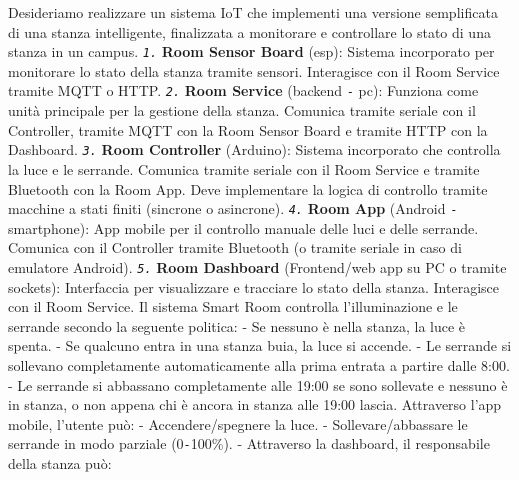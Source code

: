 \documentclass[12pt]{article}
\def\code#1{\texttt{#1}}
\begin{document}
Desideriamo realizzare un sistema IoT che implementi una versione semplificata di una stanza intelligente, finalizzata a monitorare e controllare lo stato di una stanza in un campus.\newline
\textit{\code{1.}} \textbf{Room Sensor Board} (esp): Sistema incorporato per monitorare lo stato della stanza tramite sensori. Interagisce con il Room Service tramite MQTT o HTTP.\newline
\textit{\code{2.}} \textbf{Room Service} (backend \code{-} pc): Funziona come unità principale per la gestione della stanza. Comunica tramite seriale con il Controller, tramite MQTT con la Room Sensor Board e tramite HTTP con la Dashboard.\newline
\textit{\code{3.}} \textbf{Room Controller} (Arduino): Sistema incorporato che controlla la luce e le serrande. Comunica tramite seriale con il Room Service e tramite Bluetooth con la Room App. Deve implementare la logica di controllo tramite macchine a stati finiti (sincrone o asincrone).\newline
\textit{\code{4.}} \textbf{Room App} (Android \code{-} smartphone): App mobile per il controllo manuale delle luci e delle serrande. Comunica con il Controller tramite Bluetooth (o tramite seriale in caso di emulatore Android).\newline
\textit{\code{5.}} \textbf{Room Dashboard} (Frontend/web app su PC o tramite sockets): Interfaccia per visualizzare e tracciare lo stato della stanza. Interagisce con il Room Service.\newline
Il sistema Smart Room controlla l'illuminazione e le serrande secondo la seguente politica:\newline
- Se nessuno è nella stanza, la luce è spenta.\newline
- Se qualcuno entra in una stanza buia, la luce si accende.\newline
- Le serrande si sollevano completamente automaticamente alla prima entrata a partire dalle 8:00.\newline
- Le serrande si abbassano completamente alle 19:00 se sono sollevate e nessuno è in stanza, o non appena chi è ancora in stanza alle 19:00 lascia.\newline
Attraverso l'app mobile, l'utente può:\newline
- Accendere/spegnere la luce.\newline
- Sollevare/abbassare le serrande in modo parziale (0\code{-}100\%).\newline
- Attraverso la dashboard, il responsabile della stanza può:\newline
\end{document}
